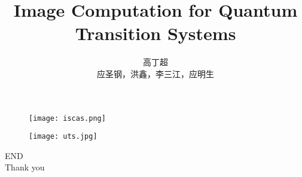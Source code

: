 \documentclass[aspectratio=1610]{ctexbeamer}
\title[TDD in quantum]{Image Computation for Quantum Transition Systems}
\author[Gcc]{高丁超\\ 应圣钢，洪鑫，李三江，应明生}
\begin{document}
\begin{frame}[plain]
  \titlepage
  \begin{figure}
    \centering
    \begin{minipage}[t]{0.48\textwidth}
    \centering
    \texttt{[image: iscas.png]}
    \end{minipage}
    \begin{minipage}[t]{0.48\textwidth}
    \centering
    \texttt{[image: uts.jpg]}
    \end{minipage}
  \end{figure}
\end{frame}

\begin{frame}
\centering
\Huge{END\\Thank you}
\end{frame}
\end{document}

